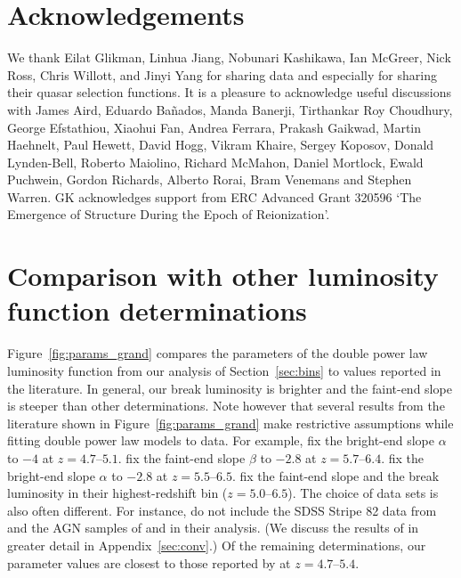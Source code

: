 \documentclass[fleqn,usenatbib]{mnras}
\begin{document}
\section*{Acknowledgements}

We thank Eilat Glikman, Linhua Jiang, Nobunari Kashi\-kawa, Ian
McGreer, Nick Ross, Chris Willott, and Jinyi Yang for sharing data and
especially for sharing their quasar selection functions.  It is a
pleasure to acknowledge useful discussions with James Aird, Eduardo
Ba\~nados, Manda Banerji, Tirthankar Roy Choudhury, George Efstathiou,
Xiaohui Fan, Andrea Ferrara, Prakash Gaikwad, Martin Haehnelt, Paul
Hewett, David Hogg, Vikram Khaire, Sergey Koposov, Donald Lynden-Bell,
Roberto Maiolino, Richard McMahon, Daniel Mortlock, Ewald Puchwein,
Gordon Richards, Alberto Rorai, Bram Venemans and Stephen Warren.  GK
acknowledges support from ERC Advanced Grant 320596 `The Emergence of
Structure During the Epoch of Reionization'.

\appendix

\section{Comparison with other luminosity function determinations}

Figure~\ref{fig:params_grand} compares the parameters of the double
power law luminosity function from our analysis of
Section~\ref{sec:bins} to values reported in the literature.  In
general, our break luminosity is brighter and the faint-end slope is
steeper than other determinations.  Note however that several results
from the literature shown in Figure~\ref{fig:params_grand} make
restrictive assumptions while fitting double power law models to data.
For example, \citet{2013ApJ...768..105M} fix the bright-end slope
$\alpha$ to $-4$ at $z=4.7$--$5.1$.  \citet{2016ApJ...833..222J} fix
the faint-end slope $\beta$ to $-2.8$ at $z=5.7$--$6.4$.
\citet{2017ApJ...847L..15O} fix the bright-end slope $\alpha$ to
$-2.8$ at $z=5.5$--$6.5$.  \citet{2015AA...578A..83G} fix the
faint-end slope and the break luminosity in their highest-redshift bin
($z=5.0$--$6.5$).  The choice of data sets is also often different.
For instance, \citet{2015AA...578A..83G} do not include the SDSS
Stripe 82 data from \citet{2013ApJ...768..105M} and the AGN samples of
\citet{2010AJ....139..906W} and \citet{2015ApJ...798...28K} in their
analysis.  (We discuss the results of \citet{2015AA...578A..83G} in
greater detail in Appendix~\ref{sec:conv}.)  Of the remaining
determinations, our parameter values are closest to those reported by
\citet{2016ApJ...829...33Y} at $z=4.7$--$5.4$.
\end{document}

